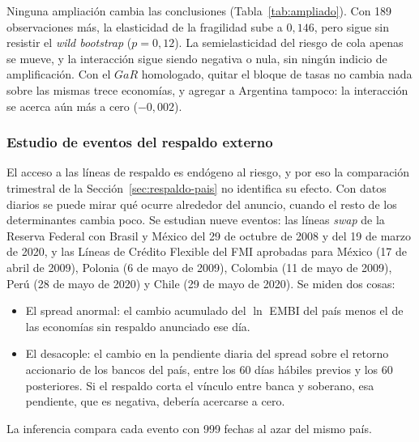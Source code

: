 Ninguna ampliación cambia las conclusiones (Tabla~\ref{tab:ampliado}). Con 189 observaciones más, la elasticidad de la fragilidad sube a $0{,}146$, pero sigue sin resistir el \textit{wild bootstrap} ($p=0{,}12$). La semielasticidad del riesgo de cola apenas se mueve, y la interacción sigue siendo negativa o nula, sin ningún indicio de amplificación. Con el $GaR$ homologado, quitar el bloque de tasas no cambia nada sobre las mismas trece economías, y agregar a Argentina tampoco: la interacción se acerca aún más a cero ($-0{,}002$).

\subsubsection{Estudio de eventos del respaldo externo}
\label{sec:eventos}

El acceso a las líneas de respaldo es endógeno al riesgo, y por eso la comparación trimestral de la Sección~\ref{sec:respaldo-pais} no identifica su efecto. Con datos diarios se puede mirar qué ocurre alrededor del anuncio, cuando el resto de los determinantes cambia poco. Se estudian nueve eventos: las líneas \textit{swap} de la Reserva Federal con Brasil y México del 29 de octubre de 2008 y del 19 de marzo de 2020, y las Líneas de Crédito Flexible del FMI aprobadas para México (17 de abril de 2009), Polonia (6 de mayo de 2009), Colombia (11 de mayo de 2009), Perú (28 de mayo de 2020) y Chile (29 de mayo de 2020). Se miden dos cosas:
\begin{itemize}
    \item El spread anormal: el cambio acumulado del $\ln$ EMBI del país menos el de las economías sin respaldo anunciado ese día.
    \item El desacople: el cambio en la pendiente diaria del spread sobre el retorno accionario de los bancos del país, entre los 60 días hábiles previos y los 60 posteriores. Si el respaldo corta el vínculo entre banca y soberano, esa pendiente, que es negativa, debería acercarse a cero.
\end{itemize}
La inferencia compara cada evento con 999 fechas al azar del mismo país.

